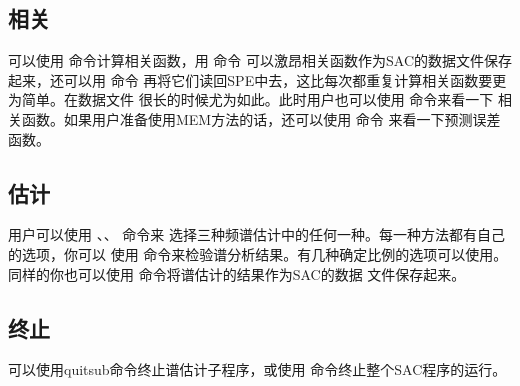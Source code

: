 \subsection{相关}
可以使用  命令计算相关函数，用  命令
可以激昂相关函数作为SAC的数据文件保存起来，还可以用  命令
再将它们读回SPE中去，这比每次都重复计算相关函数要更为简单。在数据文件
很长的时候尤为如此。此时用户也可以使用  命令来看一下
相关函数。如果用户准备使用MEM方法的话，还可以使用  命令
来看一下预测误差函数。

\subsection{估计}
用户可以使用 、、 命令来
选择三种频谱估计中的任何一种。每一种方法都有自己的选项，你可以
使用  命令来检验谱分析结果。有几种确定比例的选项可以使用。
同样的你也可以使用  命令将谱估计的结果作为SAC的数据
文件保存起来。

\subsection{终止}
可以使用quitsub命令终止谱估计子程序，或使用  命令终止整个SAC程序的运行。
